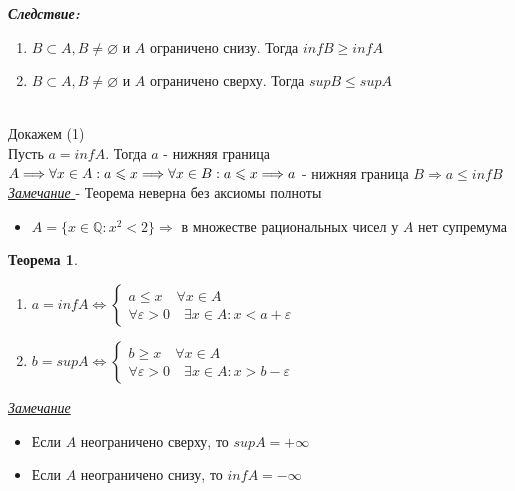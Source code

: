 \documentclass[12pt,letterpaper]{report}
\makeatletter
\newtheorem*{theorem-non}{Теорема}
\theoremstyle{definition}
\newcommand{\Q}{\mathbb{Q}}
\newcommand{\follow}{\textbf{\textit{Следствие:}}}
\newcommand{\notice}{\underline{\textit{Замечание }}}
\renewenvironment{proof}[1][\proofname]{%
   \par\pushQED{\qed}\normalfont%
   \topsep6\p@\@plus6\p@\relax
   \trivlist\item[\hskip\labelsep\bfseries#1\@addpunct{.}]%
   \ignorespaces
}{%
   \popQED\endtrivlist\@endpefalse
}
\makeatother
\begin{document}
\follow
\begin{enumerate}
    \item $B \subset A, B \neq \varnothing $ и $ A $ ограничено снизу. Тогда $inf B \geqslant inf A$
    \item $B \subset A, B \neq \varnothing $ и $ A $ ограничено сверху. Тогда $sup B \leqslant sup A$
\end{enumerate}
\begin{proof}
    \quad \\
    Докажем (1) \\
    Пусть $a = inf A$. Тогда $a$ - нижняя граница $A \Longrightarrow \forall x \in
    A : a \leqslant x \Longrightarrow \forall x \in B : a \leqslant x \Longrightarrow \\
    a$ - нижняя граница $B \Longrightarrow a \leqslant inf B$  
\end{proof}
\notice - Теорема неверна без аксиомы полноты \\
\begin{itemize}
    \item[] $A =\{x \in \Q : x^2 < 2\} \Longrightarrow$ в множестве рациональных чисел у $A$ нет супремума
\end{itemize}
\begin{theorem-non}
    \quad \\
    \begin{enumerate}
        \item $a = inf A \Longleftrightarrow 
        \begin{cases}
            a \leqslant x \quad \forall x \in A \\
            \forall \varepsilon > 0 \quad \exists x \in A : x < a + \varepsilon
        \end{cases}$ 
        \item $b = sup A \Longleftrightarrow 
        \begin{cases}
            b \geqslant x \quad \forall x \in A \\
            \forall \varepsilon > 0 \quad \exists x \in A : x > b - \varepsilon
        \end{cases}$ 
    \end{enumerate}
\end{theorem-non}
\notice
\begin{itemize}
    \item Если $A$ неограничено сверху, то $sup A = +\infty$
    \item Если $A$ неограничено снизу, то $inf A = -\infty$
\end{itemize}
\end{document}
